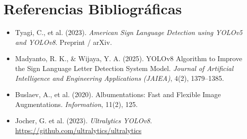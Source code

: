 \documentclass[12pt,letterpaper]{article}
\begin{document}
\section*{Referencias Bibliográficas}
\begin{itemize}[leftmargin=*]
    \item Tyagi, C., et al. (2023). \textit{American Sign Language Detection using YOLOv5 and YOLOv8}. Preprint / arXiv.
    \item Madyanto, R. K., \& Wijaya, Y. A. (2025). YOLOv8 Algorithm to Improve the Sign Language Letter Detection System Model. \textit{Journal of Artificial Intelligence and Engineering Applications (JAIEA)}, 4(2), 1379--1385.
    \item Buslaev, A., et al. (2020). Albumentations: Fast and Flexible Image Augmentations. \textit{Information}, 11(2), 125.
    \item Jocher, G. et al. (2023). \textit{Ultralytics YOLOv8}. \url{https://github.com/ultralytics/ultralytics}
\end{itemize}
\end{document}
